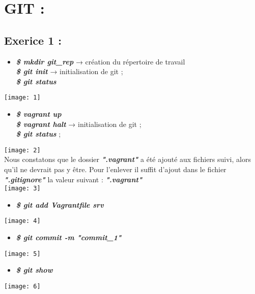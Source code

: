 \documentclass[a4paper]{article}
\begin{document}
\newpage
	\section{GIT :}
	\subsection{Exerice 1 :}
	
	\begin{itemize}
		\item \textbf{\textit{\$ mkdir git\_rep}} → création du répertoire de travail \\
			  \textbf{\textit{\$ git init}} → initialisation de git ; \\
			  \textbf{\textit{\$ git status}}  
	\end{itemize}
	\texttt{[image: 1]}
	
	\begin{itemize}
		\item \textbf{\textit{\$ vagrant up}} \\
			  \textbf{\textit{\$ vagrant halt}} → initialisation de git ; \\
			  \textbf{\textit{\$ git status}}  ; \\
	\end{itemize}
	
	\texttt{[image: 2]} \\
	
	Nous constatons que le dossier \textbf{\textit{".vagrant"}} a été ajouté aux fichiers suivi, alors qu’il ne devrait pas y être.
	Pour l’enlever il suffit d’ajout dans le fichier \textbf{\textit{".gitignore"}} la valeur suivant : \textbf{\textit{".vagrant"}} \\
	
	\texttt{[image: 3]}
	
	\begin{itemize}
		\item \textbf{\textit{\$ git add Vagrantfile srv}}
	\end{itemize}
	\texttt{[image: 4]}
	
	\begin{itemize}
		\item \textbf{\textit{\$ git commit -m "commit\_1"}}
	\end{itemize}
	\texttt{[image: 5]}
	
	\begin{itemize}
		\item \textbf{\textit{\$ git show}}
	\end{itemize}
	\texttt{[image: 6]}
	
\end{document}
